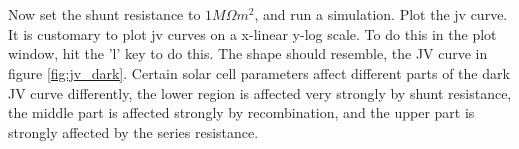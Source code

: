 \\
\\
Now set the shunt resistance to $1M \Omega m^2$, and run a simulation.  Plot the jv curve.  It is customary to plot jv curves on a x-linear y-log scale.  To do this in the plot window, hit the 'l' key to do this.  The shape should resemble, the JV curve in figure \ref{fig:jv_dark}.  Certain solar cell parameters affect different parts of the dark JV curve differently, the lower region is affected very strongly by shunt resistance, the middle part is affected strongly by recombination, and the upper part is strongly affected by the series resistance.

\vspace*{\fill}


